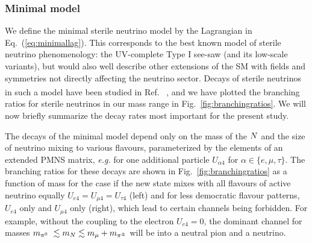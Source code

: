 \documentclass[11pt, a4paper]{article}
\newcommand{\refeq}[1]{Eq.~(\ref{#1})}
\newcommand{\reffig}[1]{Fig.~\ref{#1}}
\newcommand{\refref}[1]{Ref.~\cite{#1}}
\def\ster{\ensuremath N}
\newcounter{CommentCount}
\newcommand{\marcom}[2]{\textsuperscript{\textcolor{#1}{\theCommentCount}}\marginpar{\textsuperscript{\textcolor{#1}{\theCommentCount}}\textcolor{#1}{{\small#1: #2}}}\stepcounter{CommentCount}}
\begin{document}
\subsubsection{\label{sec:minimal}Minimal model}

We define the minimal sterile neutrino model by the Lagrangian in
\refeq{eq:minimallag}. This corresponds to the best known model of sterile
neutrino phenomenology: the UV-complete Type I see-saw (and its low-scale
variants), but would also well describe other extensions of the SM with fields
and symmetries not directly affecting the neutrino sector. Decays of sterile
neutrinos in such a model have been studied in \refref{Atre:2009rg}
\marcom{PB}{Others?}, and we have plotted the branching ratios for sterile
neutrinos in our mass range in \reffig{fig:branchingratios}. We will now
briefly summarize the decay rates most important for the present study.

The decays of the minimal model depend only on the mass of the
$\ster$ and the size of neutrino mixing to various flavours, parameterized by
the elements of an extended PMNS matrix, \emph{e.g.} for one additional
particle 
%
$U_{\alpha 4}$ for $\alpha \in \{e,\mu,\tau\}$. 
%
The branching ratios for these decays are shown in \reffig{fig:branchingratios}
as a function of mass for the case if the new state mixes with all flavours of
active neutrino equally $U_{e4}=U_{\mu 4}=U_{\tau 4}$ (left) and for less
democratic flavour patterns, $U_{e4}$ only and $U_{\mu 4}$ only (right), which 
lead to certain channels being forbidden. For example, without the coupling to the
electron $U_{e4}=0$, the dominant channel for masses $m_{\pi^0}~\lesssim
m_\ster \lesssim m_{\mu}+m_{\pi^\pm}$ will be into a neutral pion and a
neutrino.
\end{document}
